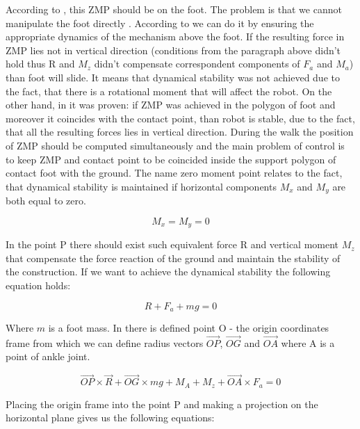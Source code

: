 \documentclass[12pt,a4paper]{report}
\begin{document}
		According to \cite{kajita2003biped}, this ZMP should be on the foot. The problem is that we cannot manipulate the foot directly \cite{mitobe2000control}. According to \cite{vukobratovic2004zero} we can do it by ensuring the appropriate dynamics of the mechanism above the foot. If the resulting force in ZMP lies not in vertical direction (conditions from the paragraph above didn't hold thus R and $M_z$ didn't compensate correspondent components of $F_a$ and $M_a$) than foot will slide. It means that dynamical stability was not achieved due to the fact, that there is a rotational moment that will affect the robot. On the other hand, in \cite{sardain2004forces} it was proven: if ZMP was achieved in the polygon of foot and moreover it coincides with the contact point, than robot is stable, due to the fact, that all the resulting forces lies in vertical direction. During the walk the position of ZMP should be computed simultaneously and the main problem of control is to keep ZMP and contact point to be coincided inside the support polygon of contact foot with the ground.
		The name zero moment point relates to the fact, that dynamical stability is maintained if horizontal components $M_x$ and $M_y$ are both equal to zero.
	
		\begin{equation}\label{eq:ZMP1}
			M_x = M_y = 0
		\end{equation}

		In the point P there should exist such equivalent force R and vertical moment $M_z$ that compensate the force reaction of the ground and maintain the stability of the construction. If we want to achieve the dynamical stability the following equation holds:

		\begin{equation}\label{eq:ZMP2}
			R + F_a + mg = 0
		\end{equation}

		Where $m$ is a foot mass. In \cite{vukobratovic2004zero} there is defined  point O - the origin coordinates frame from which we can define radius vectors $\vec{OP}$, $\vec{OG}$ and $\vec{OA}$ where A is a point of ankle joint.

		\begin{equation}\label{eq:ZMP3}
			\vec{OP} \times \vec{R} + \vec{OG} \times mg + M_A + M_z + \vec{OA} \times F_a = 0
		\end{equation}

		Placing the origin frame into the point P and making a projection on the horizontal plane gives us the following equations: 
\end{document}
